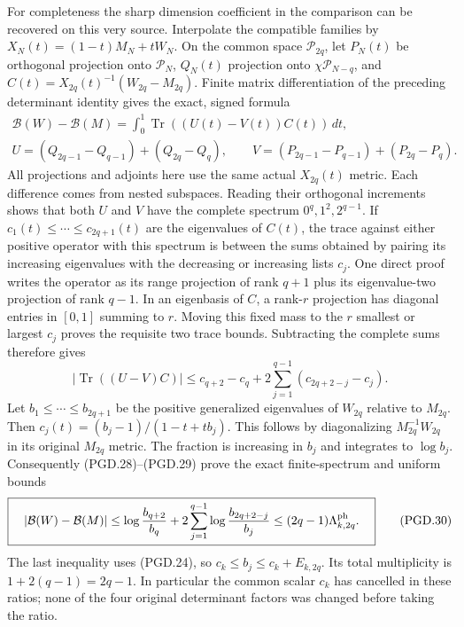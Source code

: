 For completeness the sharp dimension coefficient in the comparison
can be recovered on this very source. Interpolate the compatible
families by \(X_N(t)=(1-t)M_N+tW_N\). On the common space
\(\mathcal P_{2q}\), let \(P_N(t)\) be orthogonal projection onto
\(\mathcal P_N\), \(Q_N(t)\) projection onto
\(\chi\mathcal P_{N-q}\), and
\(C(t)=X_{2q}(t)^{-1}(W_{2q}-M_{2q})\).
Finite matrix differentiation of the preceding determinant identity
gives the exact, signed formula
\[
 \begin{gathered}
 \mathcal B(W)-\mathcal B(M)
       =\int_0^1\operatorname{Tr}((U(t)-V(t))C(t))\,dt,\\
 U=(Q_{2q-1}-Q_{q-1})+(Q_{2q}-Q_q),\qquad
 V=(P_{2q-1}-P_{q-1})+(P_{2q}-P_q).
 \end{gathered}
 \tag{PGD.28}\label{eq:pgd-exact-signed}
\]
All projections and adjoints here use the same actual \(X_{2q}(t)\)
metric. Each difference comes from nested subspaces. Reading their
orthogonal increments shows that both \(U\) and \(V\) have the
complete spectrum \(0^q,1^2,2^{q-1}\).
If \(c_1(t)\leq\cdots\leq c_{2q+1}(t)\) are the eigenvalues
of \(C(t)\), the trace against either positive operator with this
spectrum is between the sums obtained by pairing its increasing
eigenvalues with the decreasing or increasing lists \(c_j\).
One direct proof writes the operator as its range projection of rank
\(q+1\) plus its eigenvalue-two projection of rank \(q-1\).
In an eigenbasis of \(C\), a rank-\(r\) projection has diagonal
entries in \([0,1]\) summing to \(r\). Moving this fixed mass to
the \(r\) smallest or largest \(c_j\) proves the requisite two
trace bounds. Subtracting the complete sums therefore gives
\[
 |\operatorname{Tr}((U-V)C)|
 \leq c_{q+2}-c_q
       +2\sum_{j=1}^{q-1}(c_{2q+2-j}-c_j).
 \tag{PGD.29}\label{eq:pgd-spectral-bound}
\]
Let \(b_1\leq\cdots\leq b_{2q+1}\) be the positive generalized
eigenvalues of \(W_{2q}\) relative to \(M_{2q}\). Then
\(c_j(t)=(b_j-1)/(1-t+tb_j)\). This follows by diagonalizing
\(M_{2q}^{-1}W_{2q}\) in its original \(M_{2q}\) metric.
The fraction is increasing in \(b_j\) and integrates to
\(\log b_j\). Consequently (PGD.28)--(PGD.29) prove the exact
finite-spectrum and uniform bounds
\[
 \boxed{\quad
 |\mathcal B(W)-\mathcal B(M)|
 \leq\log\frac{b_{q+2}}{b_q}
      +2\sum_{j=1}^{q-1}\log\frac{b_{2q+2-j}}{b_j}
 \leq(2q-1)\Lambda_{k,2q}^{\rm ph}.
 \quad}
 \tag{PGD.30}\label{eq:pgd-signed-bound}
\]
The last inequality uses (PGD.24), so
\(c_k\leq b_j\leq c_k+E_{k,2q}\). Its total multiplicity is
\(1+2(q-1)=2q-1\). In particular the common scalar \(c_k\)
has cancelled in these ratios; none of the four original determinant
factors was changed before taking the ratio.

